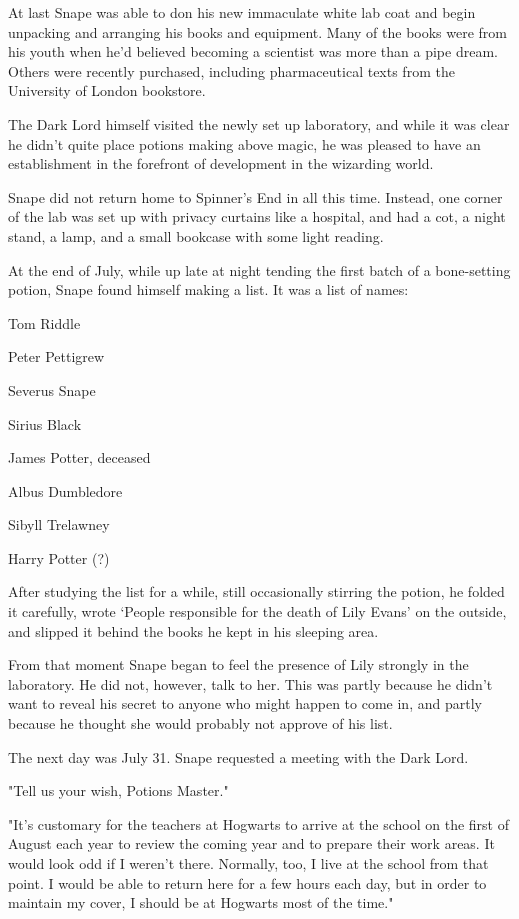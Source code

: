 At last Snape was able to don his new immaculate white lab coat and begin unpacking and arranging his books and equipment. Many of the books were from his youth when he'd believed becoming a scientist was more than a pipe dream. Others were recently purchased, including pharmaceutical texts from the University of London bookstore.

The Dark Lord himself visited the newly set up laboratory, and while it was clear he didn't quite place potions making above magic, he was pleased to have an establishment in the forefront of development in the wizarding world.

Snape did not return home to Spinner's End in all this time. Instead, one corner of the lab was set up with privacy curtains like a hospital, and had a cot, a night stand, a lamp, and a small bookcase with some light reading.

At the end of July, while up late at night tending the first batch of a bone-setting potion, Snape found himself making a list. It was a list of names:

Tom Riddle

Peter Pettigrew

Severus Snape

Sirius Black

James Potter, deceased

Albus Dumbledore

Sibyll Trelawney

Harry Potter (?)

After studying the list for a while, still occasionally stirring the potion, he folded it carefully, wrote `People responsible for the death of Lily Evans' on the outside, and slipped it behind the books he kept in his sleeping area.

From that moment Snape began to feel the presence of Lily strongly in the laboratory. He did not, however, talk to her. This was partly because he didn't want to reveal his secret to anyone who might happen to come in, and partly because he thought she would probably not approve of his list.

The next day was July 31. Snape requested a meeting with the Dark Lord.

"Tell us your wish, Potions Master."

"It's customary for the teachers at Hogwarts to arrive at the school on the first of August each year to review the coming year and to prepare their work areas. It would look odd if I weren't there. Normally, too, I live at the school from that point. I would be able to return here for a few hours each day, but in order to maintain my cover, I should be at Hogwarts most of the time."

